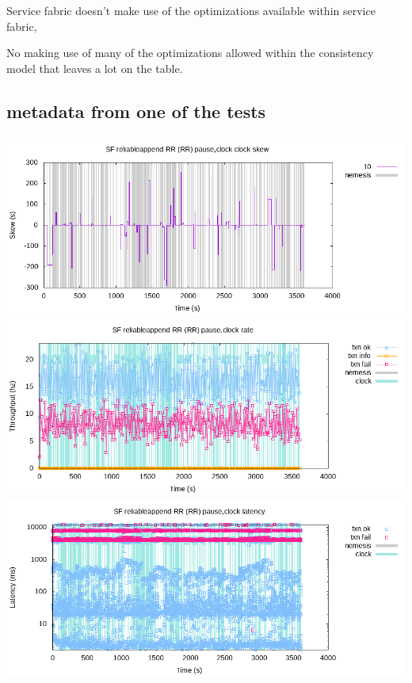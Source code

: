 \documentclass[a4paper,10pt,titlepage]{report}
\begin{document}
    Service fabric doesn't make use of the optimizations available within service fabric, 
    
    No making use of many of the optimizations allowed within the consistency model that leaves a lot on the table. 
    
    
    \subsection{metadata from one of the tests}
    \includegraphics[scale=0.5]{Report/results/store-2021-11-02-checkme-3/SF reliableappend RR (RR) pause,clock/20211102T014633.000Z/clock-skew.png}
    \\
    \includegraphics[scale=0.5]{Report/results/store-2021-11-02-checkme-3/SF reliableappend RR (RR) pause,clock/20211102T014633.000Z/rate.png}
    \\
    \includegraphics[scale=0.5]{Report/results/store-2021-11-02-checkme-3/SF reliableappend RR (RR) pause,clock/20211102T014633.000Z/latency-raw.png}
\end{document}
